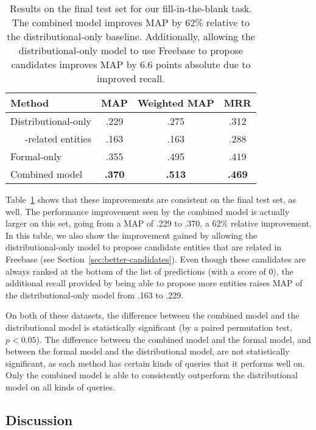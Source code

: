 \documentclass[11pt]{article}
\newcommand{\secref}[1]{Section~\ref{sec:#1}}
\newcommand{\tabref}[1]{Table~\ref{tab:#1}}
\begin{document}
\begin{table}
  \centering
  {\small
    \begin{tabular}{lccc}
      \toprule
      Method & MAP & Weighted MAP & MRR \\
      \midrule
      Distributional-only & .229 & .275 & .312 \\
      \ \ \ -related entities & .163 & .163 & .288 \\
      \midrule
      Formal-only & .355 & .495 & .419 \\
      \midrule
      Combined model & \textbf{.370} & \textbf{.513} & \textbf{.469} \\
      \bottomrule
    \end{tabular}
  }
  \caption{Results on the final test set for our fill-in-the-blank task.  The
  combined model improves MAP by 62\% relative to the distributional-only
  baseline.  Additionally, allowing the distributional-only model to use
  Freebase to propose candidates improves MAP by 6.6 points absolute due to
  improved recall.}
  \label{tab:final-results}
\end{table}

\tabref{final-results} shows that these improvements are consistent on the
final test set, as well.  The performance improvement seen by the combined
model is actually larger on this set, going from a MAP of .229 to .370, a 62\%
relative improvement.  In this table, we also show the improvement gained by
allowing the distributional-only model to propose candidate entities that are
related in Freebase (see \secref{better-candidates}).  Even though these
candidates are always ranked at the bottom of the list of predictions (with a
score of 0), the additional recall provided by being able to propose more
entities raises MAP of the distributional-only model from .163 to .229.

On both of these datasets, the difference between the combined model and the
distributional model is statistically significant (by a paired permutation
test, $p < 0.05$).  The difference between the combined model and the formal
model, and between the formal model and the distributional model, are not
statistically significant, as each method has certain kinds of queries that it
performs well on.  Only the combined model is able to consistently outperform
the distributional model on all kinds of queries.

\subsection{Discussion}
\end{document}
